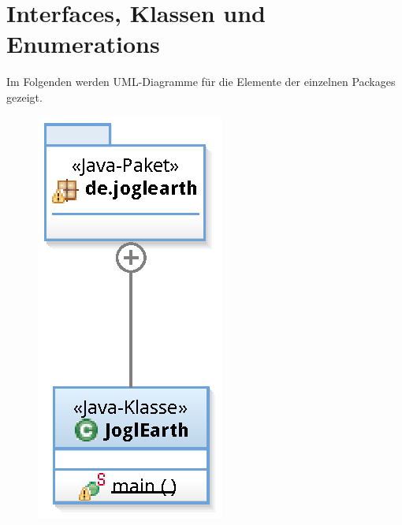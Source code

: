 \documentclass[10pt]{scrreprt}
\begin{document}
\newpage

\section{Interfaces, Klassen und Enumerations}

Im Folgenden werden UML-Diagramme für die Elemente der einzelnen Packages gezeigt.

\vspace{5mm}

\begin{figure}[!htb]
	\centering
		\begin{minipage}[c]{3cm}
        \centering
			\includegraphics[scale=0.55]{de_joglearth.eps}
        \end{minipage}
        \hspace{2cm}
        \begin{minipage}[c]{6cm}
        \centering

\end{minipage}
\end{figure}
\end{document}
